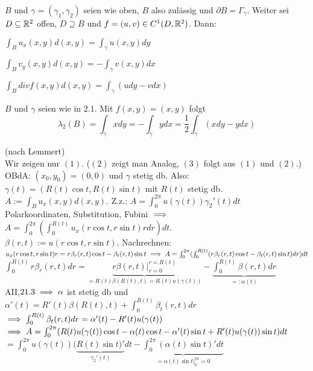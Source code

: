 \documentclass{article}
\begin{document}
\begin{satz}
$B$ und $\gamma = (\gamma_1,\gamma_2)$ seien wie oben, $B$ also zulässig und $\partial B = \Gamma_\gamma$. Weiter sei $D \subseteq \mathbb{R}^2$ offen, $D \supseteq B$ und $f = (u,v) \in C^1(D,\mathbb{R}^2)$.
Dann:
\begin{liste}
\item $\int_B u_x(x,y)d(x,y) = \int_\gamma u(x,y)dy$
\item $\int_B v_y(x,y)d(x,y) = -\int_\gamma v(x,y)dx$
\item $\int_B div f(x,y)d(x,y) = \int_\gamma (udy-vdx)$
\end{liste}
\end{satz}
\begin{anwendung}
$B$ und $\gamma$ seien wie in $2.1$. Mit $f(x,y)=(x,y)$ folgt $$\lambda_2(B) = \int_\gamma xdy = -\int_\gamma ydx = \frac{1}{2} \int_\gamma(xdy-ydx)$$
\end{anwendung}
\begin{beweis}
(nach Lemmert)\\
Wir zeigen nur $(1)$. ($(2)$ zeigt man Analog, $(3)$ folgt aus $(1)$ und $(2)$.)\\
OBdA: $(x_0,y_0)=(0,0)$ und $\gamma$ stetig db. Also: $\gamma(t)=(R(t)\cos{t},R(t)\sin{t})$ mit $R(t)$ stetig db.\\
$A:=\int_B u_x(x,y)d(x,y)$. Z.z.: $A=\int_0^{2\pi}u(\gamma(t))\gamma_2'(t)dt$\\
Polarkoordinaten, Substitution, Fubini $\implies$ $A=\int^{2\pi}_0(\int^{R(t)}_0 u_x(r \cos{t},r \sin{t})r dr)dt$.\\
$\beta(r,t):=u(r \cos{t}, r \sin{t})$. Nachrechnen: $u_x(r \cos{t},r \sin{t})r=r\beta_r(r,t)\cos{t}-\beta_t(r,t)\sin{t} \implies A=\int_0^{2\pi}(\int_0^{R(t)}(r\beta_r(r,t)\cos{t}-\beta_t(r,t)\sin{t})dr)dt$\\
$\int_0^{R(t)}r\beta_r(r,t)dr=\underbrace{r\beta(r,t)|_{r=0}^{r=R(t)}}_{=R(t)\beta(R(t),t)=R(t)u(\gamma(t))} - \underbrace{\int_0^{R(t)}\beta(r,t)dr}_{=:\alpha(t)}$\\
AII,$21.3\implies \alpha$ ist stetig db und $\alpha'(t)=R'(t)\beta(R(t),t)+\int_0^{R(t)}\beta_t(r,t)dr$ \\
$\implies \int_0^{R(t)}\beta_t(r,t)dr=\alpha'(t)-R'(t)u(\gamma(t))$\\
$\implies A=\int_0^{2\pi}(R(t)u(\gamma(t))\cos{t}-\alpha(t)\cos{t}-\alpha'(t)\sin{t}+R'(t)u(\gamma(t))\sin{t})dt$\\
$=\int_0^{2\pi}u(\gamma(t))(\underbrace{R(t)\sin{t})'}_{\gamma_2'(t)}dt-\underbrace{\int_0^{2\pi}(\alpha(t)\sin{t})'dt}_{=\alpha(t)\sin{t}|_0^{2\pi}=0}$
\end{beweis}
\end{document}
